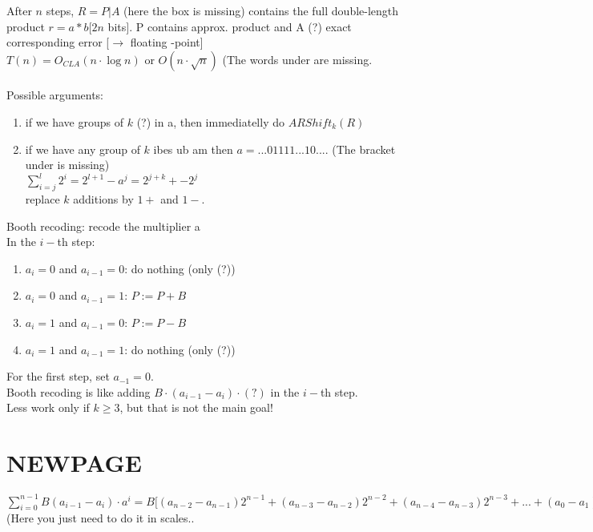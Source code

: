 After $n$ steps, $R=P|A$ (here the box is missing) contains the full double-length product $r=a*b [2n$ bits$]$. P contains approx. product and A (?) exact corresponding error [$\to$ floating -point] \\
\implies $T(n)=O_{CLA}(n\cdot \log n)$ or $O(n\cdot \sqrt{n})$ (The words under are missing.
\\
\\

Possible arguments:
\begin{enumerate}
    \item if we have groups of $k$ (?) in a, then immediatelly do $ARShift_k(R)$
    \item if we have any group of $k$ ibes ub am then $a= ... 01111 ...10....$ (The bracket under is missing) \\
    $\sum_{i=j}^l 2^i=2^{l+1}-a^j=2^{j+k}+-2^j$ \\
    \implies replace $k$ additions by $1+$ and $1-$.
\end{enumerate}

Booth recoding: recode the multiplier a\\
In the $i-$th step:
\begin{enumerate}
    \item $a_i=0$ and $a_{i-1}=0$: do nothing (only (?))
    \item $a_i=0$ and $a_{i-1}=1$: $P:=P+B$
    \item $a_i=1$ and $a_{i-1}=0$: $P:=P-B$
    \item $a_i=1$ and $a_{i-1}=1$: do nothing (only (?))
\end{enumerate}

For the first step, set $a_{-1}=0$. \\
Booth recoding is like adding $B\cdot (a_{i-1}-a_i)\cdot (?)$ in the $i-$th step. \\
\implies Less work only if $k\ge 3$, but that is not the main goal!\\
\bigskip

\section*{NEWPAGE}

$\sum_{i=0}^{n-1} B(a_{i-1}-a_i)\cdot a^i=B[(a_{n-2}-a_{n-1})2^{n-1}+(a_{n-3}-a_{n-2})2^{n-2}+ (a_{n-4}-a_{n-3})2^{n-3}+ ... + (a_{0}-a_{1})2^{1}+(a_{-1}-a_{0})2^{0}$ \\
(Here you just need to do it in scales.. \\

